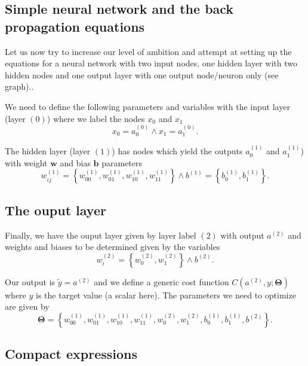 \documentclass[%
oneside,                 %
final,                   %
10pt]{article}
\begin{document}
\subsection{Simple neural network and the  back propagation equations}

Let us now try to increase our level of ambition and attempt at setting 
up the equations for a neural network with two input nodes, one hidden
layer with two hidden nodes and one output layer with one output node/neuron only (see graph)..

We need to define the following parameters and variables with the input layer (layer $(0)$) 
where we label the  nodes $x_0$ and $x_1$
\[
x_0 = a_0^{(0)} \wedge x_1 = a_1^{(0)}.
\]

The  hidden layer (layer $(1)$) has  nodes which yield the outputs $a_0^{(1)}$ and $a_1^{(1)}$) with  weight $\bm{w}$ and bias $\bm{b}$ parameters
\[
w_{ij}^{(1)}=\left\{w_{00}^{(1)},w_{01}^{(1)},w_{10}^{(1)},w_{11}^{(1)}\right\} \wedge b^{(1)}=\left\{b_0^{(1)},b_1^{(1)}\right\}.
\]

\subsection{The ouput layer}

Finally, we have the ouput layer given by layer label $(2)$ with output $a^{(2)}$ and weights and biases to be determined given by the variables
\[
w_{i}^{(2)}=\left\{w_{0}^{(2)},w_{1}^{(2)}\right\} \wedge b^{(2)}.
\]

Our output is $\tilde{y}=a^{(2)}$ and we define a generic cost function $C(a^{(2)},y;\bm{\Theta})$ where $y$ is the target value (a scalar here).
The parameters we need to optimize are given by
\[
\bm{\Theta}=\left\{w_{00}^{(1)},w_{01}^{(1)},w_{10}^{(1)},w_{11}^{(1)},w_{0}^{(2)},w_{1}^{(2)},b_0^{(1)},b_1^{(1)},b^{(2)}\right\}.
\]

\subsection{Compact expressions}
\end{document}
